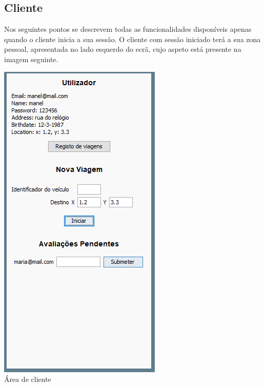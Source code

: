 \documentclass[a4paper]{article}
\begin{document}
\subsection{Cliente}
Nos seguintes pontos se descrevem todas as funcionalidades disponíveis apenas quando o cliente inicia a sua sessão. O cliente com sessão iniciado terá a sua zona pessoal, apresentada no lado esquerdo do ecrã, cujo aspeto está presente na imagem seguinte.
\begin{center}
  \includegraphics[scale=0.70]{janela_cliente}\\
  \caption{Área de cliente}
  \label{fig:picture}
\end{center}
\end{document}

